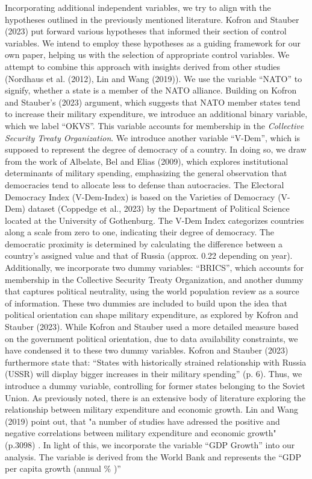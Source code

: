 \documentclass[12pt,a4paper]{article}
\begin{document}
Incorporating additional independent variables, we try to align with the hypotheses outlined in the previously mentioned literature. Kofron and Stauber (2023) put forward various hypotheses that informed their section of control variables. We intend to employ these hypotheses as a guiding framework for our own paper, helping us with the selection of appropriate control variables. We attempt to combine this approach with insights derived from other studies (Nordhaus et al. (2012), Lin and Wang (2019)). We use the variable “NATO” to signify, whether a state is a member of the NATO alliance. Building on Kofron and Stauber’s (2023) argument, which suggests that NATO member states tend to increase their military expenditure, we introduce an additional binary variable, which we label “OKVS”. This variable accounts for membership in the \textit{Collective Security Treaty Organization}. 
We introduce another variable “V-Dem”, which is supposed to represent the degree of democracy of a country. In doing so, we draw from the work of Albelate, Bel and Elias (2009), which explores institutional determinants of military spending, emphasizing the general observation that democracies tend to allocate less to defense than autocracies. The Electoral Democracy Index (V-Dem-Index) is based on the Varieties of Democracy (V-Dem) dataset (Coppedge et al., 2023) by the Department of Political Science located at the University of Gothenburg. The V-Dem Index categorizes countries along a scale from zero to one, indicating their degree of democracy. The democratic proximity is determined by calculating the difference between a country’s assigned value and that of Russia (approx. 0.22 depending on year). Additionally, we incorporate two dummy variables: “BRICS”, which accounts for membership in the Collective Security Treaty Organization, and another dummy that captures political neutrality, using the world population review as a source of information. These two dummies are included to build upon the idea that political orientation can shape military expenditure, as explored by Kofron and Stauber (2023). While Kofron and Stauber used a more detailed measure based on the government political orientation, due to data availability constraints, we have condensed it to these two dummy variables. Kofron and Stauber (2023) furthermore state that: “States with historically strained relationship with Russia (USSR) will display bigger increases in their military spending” (p. 6). Thus, we introduce a dummy variable, controlling for former states belonging to the Soviet Union. As previously noted, there is an extensive body of literature exploring the relationship between military expenditure and economic growth. Lin and Wang (2019) point out, that "a number of studies have adressed the positive and negative correlations between military expenditure and economic growth" (p.3098) . In light of this, we incorporate the variable “GDP Growth” into our analysis. The variable is derived from the World Bank and represents the “GDP per capita growth (annual \% )”\\
\end{document}

